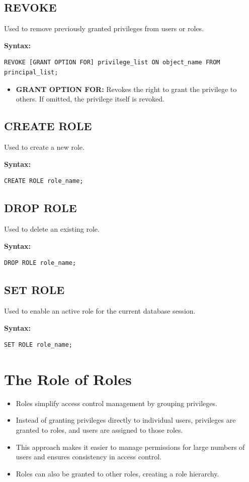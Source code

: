 \documentclass[12pt,a4paper]{article}
\begin{document}
\subsection{REVOKE}
Used to remove previously granted privileges from users or roles.

\textbf{Syntax:}
\begin{verbatim}
REVOKE [GRANT OPTION FOR] privilege_list ON object_name FROM principal_list;
\end{verbatim}

\begin{itemize}
    \item \textbf{GRANT OPTION FOR:} Revokes the right to grant the privilege to others. If omitted, the privilege itself is revoked.
\end{itemize}

\subsection{CREATE ROLE}
Used to create a new role.

\textbf{Syntax:}
\begin{verbatim}
CREATE ROLE role_name;
\end{verbatim}

\subsection{DROP ROLE}
Used to delete an existing role.

\textbf{Syntax:}
\begin{verbatim}
DROP ROLE role_name;
\end{verbatim}

\subsection{SET ROLE}
Used to enable an active role for the current database session.

\textbf{Syntax:}
\begin{verbatim}
SET ROLE role_name;
\end{verbatim}

\section{The Role of Roles}
\begin{itemize}
    \item Roles simplify access control management by grouping privileges.
    \item Instead of granting privileges directly to individual users, privileges are granted to roles, and users are assigned to those roles.
    \item This approach makes it easier to manage permissions for large numbers of users and ensures consistency in access control.
    \item Roles can also be granted to other roles, creating a role hierarchy.
\end{itemize}
\end{document}
